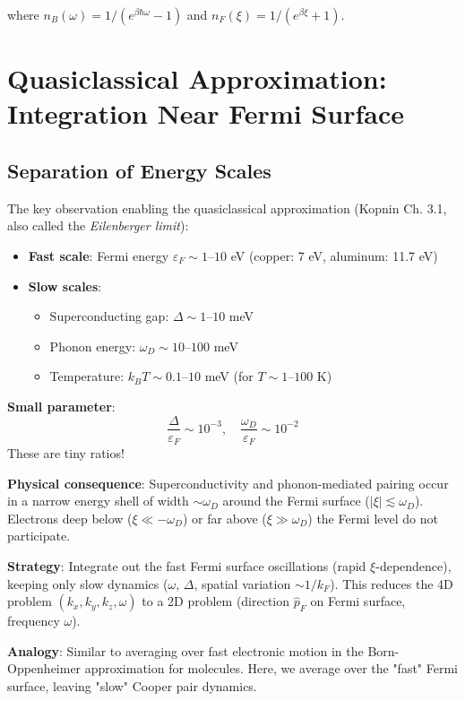 \documentclass[12pt]{article}
\begin{document}
where $n_B(\omega) = 1/(e^{\beta\hbar\omega} - 1)$ and $n_F(\xi) = 1/(e^{\beta\xi} + 1)$.

\section{Quasiclassical Approximation: Integration Near Fermi Surface}

\subsection{Separation of Energy Scales}

The key observation enabling the quasiclassical approximation (Kopnin Ch. 3.1, also called the \textit{Eilenberger limit}):
\begin{itemize}
\item \textbf{Fast scale}: Fermi energy $\varepsilon_F \sim 1\text{--}10$ eV (copper: 7 eV, aluminum: 11.7 eV)
\item \textbf{Slow scales}:
  \begin{itemize}
  \item Superconducting gap: $\Delta \sim 1\text{--}10$ meV
  \item Phonon energy: $\omega_D \sim 10\text{--}100$ meV
  \item Temperature: $k_B T \sim 0.1\text{--}10$ meV (for $T \sim 1\text{--}100$ K)
  \end{itemize}
\end{itemize}

\textbf{Small parameter}:
\begin{equation}
\frac{\Delta}{\varepsilon_F} \sim 10^{-3}, \quad \frac{\omega_D}{\varepsilon_F} \sim 10^{-2}
\end{equation}
These are tiny ratios!

\textbf{Physical consequence}: Superconductivity and phonon-mediated pairing occur in a narrow energy shell of width $\sim \omega_D$ around the Fermi surface ($|\xi| \lesssim \omega_D$). Electrons deep below ($\xi \ll -\omega_D$) or far above ($\xi \gg \omega_D$) the Fermi level do not participate.

\textbf{Strategy}: Integrate out the fast Fermi surface oscillations (rapid $\xi$-dependence), keeping only slow dynamics ($\omega$, $\Delta$, spatial variation $\sim 1/k_F$). This reduces the 4D problem $(k_x, k_y, k_z, \omega)$ to a 2D problem (direction $\hat{p}_F$ on Fermi surface, frequency $\omega$).

\textbf{Analogy}: Similar to averaging over fast electronic motion in the Born-Oppenheimer approximation for molecules. Here, we average over the "fast" Fermi surface, leaving "slow" Cooper pair dynamics.
\end{document}

